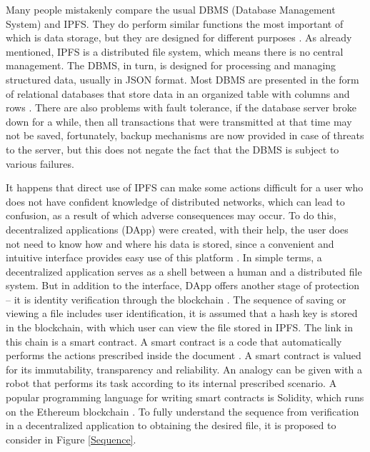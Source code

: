 \documentclass[10pt,conference,a4paper]{IEEEtran_EDM}
\begin{document}
Many people mistakenly compare the usual DBMS (Database Management System) and IPFS.
They do perform similar functions the most important of which is data storage, but they are designed for different purposes \cite{Ruan}.
As already mentioned, IPFS is a distributed file system, which means there is no central management.
The DBMS, in turn, is designed for processing and managing structured data, usually in JSON format.
Most DBMS are presented in the form of relational databases that store data in an organized table with columns and rows \cite{Gillenson}.
There are also problems with fault tolerance, if the database server broke down for a while, then all transactions that were transmitted at that time may not be saved, fortunately, backup mechanisms are now provided in case of threats to the server, but this does not negate the fact that the DBMS is subject to various failures.

It happens that direct use of IPFS can make some actions difficult for a user who does not have confident knowledge of distributed networks, which can lead to confusion, as a result of which adverse consequences may occur.
To do this, decentralized applications (DApp) were created, with their help, the user does not need to know how and where his data is stored, since a convenient and intuitive interface provides easy use of this platform \cite{Infante}.
In simple terms, a decentralized application serves as a shell between a human and a distributed file system.
But in addition to the interface, DApp offers another stage of protection – it is identity verification through the blockchain \cite{Lin}.
The sequence of saving or viewing a file includes user identification, it is assumed that a hash key is stored in the blockchain, with which user can view the file stored in IPFS.
The link in this chain is a smart contract.
A smart contract is a code that automatically performs the actions prescribed inside the document \cite{Frolov}.
A smart contract is valued for its immutability, transparency and reliability.
An analogy can be given with a robot that performs its task according to its internal prescribed scenario.
A popular programming language for writing smart contracts is Solidity, which runs on the Ethereum blockchain \cite{Khan Nabeel}.
To fully understand the sequence from verification in a decentralized application to obtaining the desired file, it is proposed to consider in Figure \ref{Sequence}.
\end{document}
